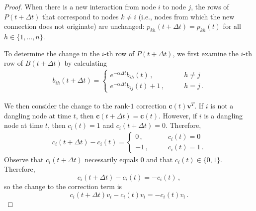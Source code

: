 \documentclass[journal,transmag]{IEEEtran}
\newcommand{\vecb}[1]{\mathbf{#1}}
\newcommand{\tdt}{t+\Delta t}
\begin{document}
\begin{proof}
When there is a new interaction from node $i$ to
node $j$, the rows of $P(\tdt)$ that correspond to nodes
$k \neq i$ (i.e., nodes from which the new connection does not
originate) are unchanged: $p_{kh}(\tdt) = p_{kh}(t)$ for all
$h\in\{1,\ldots, n\}$.  

To determine the change in the $i$-th row of
$P(t + \Delta t)$, we first examine the $i$-th row of
$B(t + \Delta t)$ by calculating
\begin{align}
  b_{ih}(t + \Delta t) =
  \begin{cases}
    e^{-\alpha \Delta t}b_{ih}(t)\,,\qquad & h \neq j \\
    e^{-\alpha \Delta t}b_{ij}(t) + 1\,, \qquad & h = j\,.
  \end{cases}
\end{align}

We then consider the change to the rank-$1$ correction 
$\vecb{c}(t)\vecb{v}^T$. If $i$ is not a dangling node at time $t$,
then $\vecb{c}(t+\Delta t) = \vecb{c}(t)$. However, if $i$ is a
dangling node at time $t$, then $ c_i(t) = 1$ and $c_i(t+\Delta t) =
0$.  Therefore,
\begin{align}
  c_i(t+\Delta t) - c_i(t) = 
  \begin{cases}
    0\,, \quad & c_i(t) = 0 \\
    -1\,,  \qquad & c_i(t) = 1\,.
  \end{cases}
\end{align}
Observe that $c_i(t+\Delta t)$ necessarily equals $0$ and that $c_i(t)
\in \lbrace 0 , 1 \rbrace$. Therefore,
\begin{equation}
  c_i(t+\Delta t) - c_i(t) = -c_i(t)\,,
\end{equation}
so the change to the correction term is
\begin{equation}
  c_{i}(t+\Delta t)v_i - c_{i}(t)v_i = -c_{i}(t)v_i\,.
\end{equation}


\end{proof}
\end{document}
